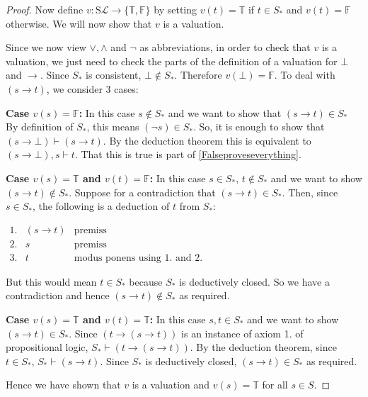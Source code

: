 \documentclass[11pt]{article}
\newcommand{\PF}{\mathrm{S}}
\newcommand{\proves}{\vdash}
\newcommand{\mcal}[1]{\mathcal{#1}}
\newcommand{\F}{\mathbb{F}}
\newcommand{\T}{\mathbb{T}}
\begin{document}
\begin{proof}
Now define $v:\PF\mcal{L}\rightarrow \{\T,\F\}$ by setting $v(t)=\T$ if $t\in S_*$ and $v(t)=\F$ otherwise. We will now show that $v$ is a valuation.

Since we now view $\vee,\wedge$ and $\neg$ as abbreviations, in order to check that $v$ is a valuation, we just need to check the parts of the definition of a valuation for $\bot$ and $\rightarrow$. Since $S_*$ is consistent, $\bot\notin S_*$. Therefore $v(\bot)=\F$. To deal with $(s\rightarrow t)$, we consider $3$ cases:

\medskip

\noindent
\textbf{Case $v(s)=\F$:} In this case $s\notin S_*$ and we want to show that $(s\rightarrow t)\in S_*$ By definition of $S_*$, this means $(\neg s)\in S_*$. So, it is enough to show that $(s\rightarrow \bot)\proves (s\rightarrow t)$. By the deduction theorem this is equivalent to $(s\rightarrow \bot),s\proves t$. That this is true is part of \ref{Falseproveseverything}.

\smallskip
\noindent
\textbf{Case $v(s)=\T$ and $v(t)=\F$:} In this case $s\in S_*$, $t\notin S_*$ and we want to show $(s\rightarrow t)\notin S_*$. Suppose for a contradiction that $(s\rightarrow t)\in S_*$. Then, since $s\in S_*$, the following is a deduction of $t$ from $S_*$:

\bigskip
$
\begin{array}{rcl}
  1. & (s\rightarrow t) & \text{premiss} \\
  2. & s & \text{premiss} \\
  3. & t & \text{modus ponens using $1.$ and $2.$}
\end{array}
$

\bigskip

But this would mean $t\in S_*$ because $S_*$ is deductively closed. So we have a contradiction and hence $(s\rightarrow t)\notin S_*$ as required.

\smallskip
\noindent
\textbf{Case $v(s)=\T$ and $v(t)=\T$:} In this case $s, t\in S_*$ and we want to show $(s\rightarrow t)\in S_*$. Since $(t\rightarrow(s\rightarrow t))$ is an instance of axiom 1. of propositional logic, $S_*\proves (t\rightarrow(s\rightarrow t))$. By the deduction theorem, since $t\in S_*$, $S_*\proves (s\rightarrow t)$. Since $S_*$ is deductively closed, $(s\rightarrow t)\in S_*$ as required.

\smallskip

Hence we have shown that $v$ is a valuation and $v(s)=\T$ for all $s\in S$.
\end{proof}
\end{document}
